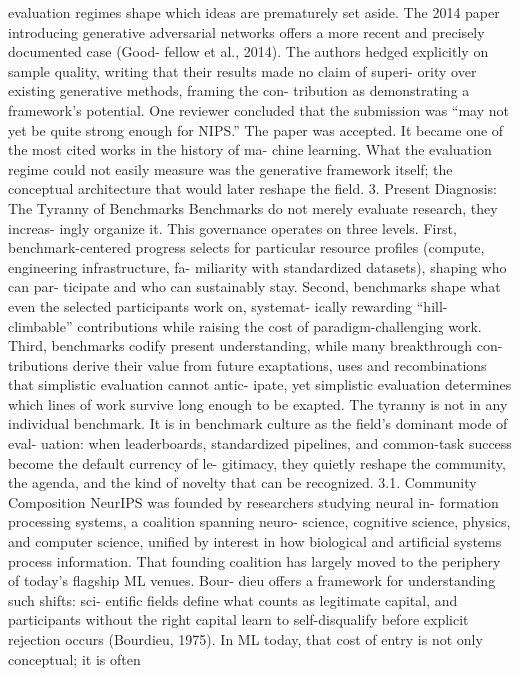 evaluation regimes shape which ideas are prematurely set
aside.
The 2014 paper introducing generative adversarial networks
offers a more recent and precisely documented case (Good-
fellow et al., 2014). The authors hedged explicitly on sample
quality, writing that their results made no claim of superi-
ority over existing generative methods, framing the con-
tribution as demonstrating a framework’s potential. One
reviewer concluded that the submission was “may not yet
be quite strong enough for NIPS.” The paper was accepted.
It became one of the most cited works in the history of ma-
chine learning. What the evaluation regime could not easily
measure was the generative framework itself; the conceptual
architecture that would later reshape the field.
3. Present Diagnosis: The Tyranny of
Benchmarks
Benchmarks do not merely evaluate research, they increas-
ingly organize it. This governance operates on three levels.
First, benchmark-centered progress selects for particular
resource profiles (compute, engineering infrastructure, fa-
miliarity with standardized datasets), shaping who can par-
ticipate and who can sustainably stay. Second, benchmarks
shape what even the selected participants work on, systemat-
ically rewarding “hill-climbable” contributions while raising
the cost of paradigm-challenging work. Third, benchmarks
codify present understanding, while many breakthrough con-
tributions derive their value from future exaptations, uses
and recombinations that simplistic evaluation cannot antic-
ipate, yet simplistic evaluation determines which lines of
work survive long enough to be exapted.
The tyranny is not in any individual benchmark. It is in
benchmark culture as the field’s dominant mode of eval-
uation: when leaderboards, standardized pipelines, and
common-task success become the default currency of le-
gitimacy, they quietly reshape the community, the agenda,
and the kind of novelty that can be recognized.
3.1. Community Composition
NeurIPS was founded by researchers studying neural in-
formation processing systems, a coalition spanning neuro-
science, cognitive science, physics, and computer science,
unified by interest in how biological and artificial systems
process information. That founding coalition has largely
moved to the periphery of today’s flagship ML venues. Bour-
dieu offers a framework for understanding such shifts: sci-
entific fields define what counts as legitimate capital, and
participants without the right capital learn to self-disqualify
before explicit rejection occurs (Bourdieu, 1975). In ML
today, that cost of entry is not only conceptual; it is often
